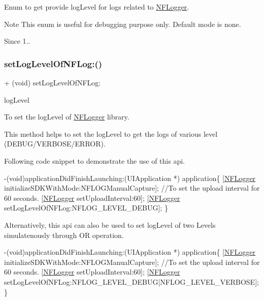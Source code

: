 Enum to get provide log\+Level for logs related to \hyperlink{interface_n_f_logger}{N\+F\+Logger}. 

\begin{DoxyNote}{Note}
This enum is useful for debugging purpose only. Default mode is none.
\end{DoxyNote}
\begin{DoxySince}{Since}
1.. 
\end{DoxySince}
\mbox{\label{interface_n_f_logger_a6df3f92166f017f7574d7cf67dc6417e}} 
\subsubsection{\texorpdfstring{set\+Log\+Level\+Of\+N\+F\+Log\+:()}{setLogLevelOfNFLog:()}}
{\footnotesize\ttfamily + (void) set\+Log\+Level\+Of\+N\+F\+Log\+: \begin{DoxyParamCaption}\item[{(N\+F\+Log\+Level)}]{log\+Level }\end{DoxyParamCaption}}



To set the log\+Level of \hyperlink{interface_n_f_logger}{N\+F\+Logger} library. 

This method helps to set the log\+Level to get the logs of various level (D\+E\+B\+U\+G/\+V\+E\+R\+B\+O\+S\+E/\+E\+R\+R\+OR).

Following code snippet to demonstrate the use of this api. 
\begin{DoxyCode}
-(void)applicationDidFinishLaunching:(UIApplication *) application\{
     [\hyperlink{interface_n_f_logger}{NFLogger} initializeSDKWithMode:NFLOGManualCapture];
     \textcolor{comment}{//To set the upload interval for 60 seconds.}
     [\hyperlink{interface_n_f_logger}{NFLogger} setUploadInterval:60];
     [\hyperlink{interface_n_f_logger}{NFLogger} setLogLevelOfNFLog:NFLOG\_LEVEL\_DEBUG];
\}
\end{DoxyCode}


Alternatively, this api can also be used to set log\+Level of two Level\textquotesingle{}s simulatenously through OR operation. 
\begin{DoxyCode}
-(void)applicationDidFinishLaunching:(UIApplication *) application\{
     [\hyperlink{interface_n_f_logger}{NFLogger} initializeSDKWithMode:NFLOGManualCapture];
     \textcolor{comment}{//To set the upload interval for 60 seconds.}
     [\hyperlink{interface_n_f_logger}{NFLogger} setUploadInterval:60];
     [\hyperlink{interface_n_f_logger}{NFLogger} setLogLevelOfNFLog:NFLOG\_LEVEL\_DEBUG|NFLOG\_LEVEL\_VERBOSE];
\}
\end{DoxyCode}
 
